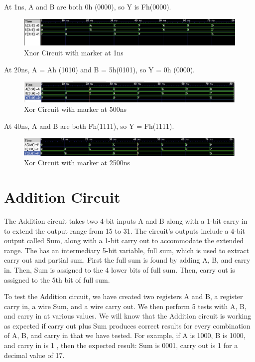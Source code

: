\documentclass[12pt]{article}
\begin{document}
 At 1ns, A and B are both 0h (0000), so Y is Fh(0000).
 \begin{figure}[H]
  \centering
  \includegraphics[width = 1.0\textwidth]{Xnor/XNOR-0ns.png}
  \caption{Xnor Circuit with marker at 1ns}
  \label{fig:enter-label} 
 \end{figure} 
 
 At 20ns, A = Ah (1010) and B = 5h(0101), so Y = 0h (0000).
  \begin{figure}[H]
  \centering 
 \includegraphics[width = 1.0\textwidth]{Xnor/XNOR-20ns.png}
  \caption{Xor Circuit with marker at 500ns}
  \label{fig:enter-label}
  \end{figure}
 
 At 40ns, A and B are both Fh(1111), so Y = Fh(1111).
  \begin{figure}[H]
  \centering 
 \includegraphics[width = 1.0\textwidth]{Xnor/XNOR-40ns.png}
  \caption{Xor Circuit with marker at 2500ns}
  \label{fig:enter-label}
  \end{figure}
 

\section{Addition Circuit}
The Addition circuit takes two 4-bit inputs A and B along with a 1-bit carry in to extend the output range from 15 to 31. The circuit’s outputs include  a 4-bit output called Sum, along with a 1-bit carry out to accommodate the extended range. The has an intermediary 5-bit variable, full sum, which is used to extract carry out and partial sum. First the full sum is found by adding A, B, and carry in. Then, Sum is assigned to the 4 lower bits of full sum. Then, carry out is assigned to the 5th bit of full sum. 


To test the Addition circuit, we have created two registers A and B, a register carry in, a wire Sum, and a wire carry out. We then perform 5 tests with A, B, and carry in at various values. We will know that the Addition circuit is working as expected if carry out plus Sum produces correct results for every combination of A, B, and carry in that we have tested. For example, if A is 1000, B is 1000, and carry in is 1 , then the expected result: Sum is 0001, carry out is 1 for a decimal value of 17.

\end{document}

